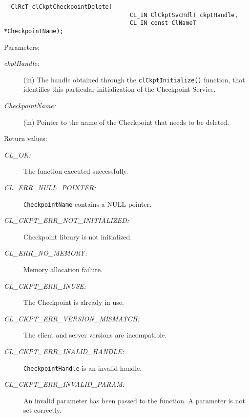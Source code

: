 \begin{flushleft}
\begin{Desc}
\footnotesize\begin{verbatim}  ClRcT clCkptCheckpointDelete(
                              		CL_IN ClCkptSvcHdlT ckptHandle,
                              		CL_IN const ClNameT  *CheckpointName);
\end{verbatim}
\normalsize
\end{Desc}
\begin{Desc}
\item[Parameters:]
\begin{description}
\item[{\em ckpt\-Handle:}](in) The handle obtained through the {\tt{clCkptInitialize()}} function, that identifies this particular
initialization of the Checkpoint Service. \item[{\em Checkpoint\-Name:}](in) Pointer to the name of the Checkpoint that needs to be deleted.\end{description}
\end{Desc}
\begin{Desc}
\item[Return values:]
\begin{description}
\item[{\em CL\_\-OK:}]The function executed successfully. 
\item[{\em CL\_\-ERR\_\-NULL\_\-POINTER:}]{\tt{CheckpointName}} contains a NULL pointer. 
\item[{\em CL\_\-CKPT\_\-ERR\_\-NOT\_\-INITIALIZED:}]Checkpoint library is not initialized. 
\item[{\em CL\_\-ERR\_\-NO\_\-MEMORY:}]Memory allocation failure. 
\item[{\em CL\_\-CKPT\_\-ERR\_\-INUSE:}]The Checkpoint is already in use.
\item[{\em CL\_\-CKPT\_\-ERR\_\-VERSION\_\-MISMATCH:}]The client and server versions are incompatible.
\item[{\em CL\_\-CKPT\_\-ERR\_\-INALID\_\-HANDLE:}]{\tt{CheckpointHandle}} is an invalid handle.
\item[{\em CL\_\-CKPT\_\-ERR\_\-INVALID\_\-PARAM:}]An invalid parameter has been passed to the function. A parameter is not set correctly.


\end{description}
\end{Desc}
\end{flushleft}
